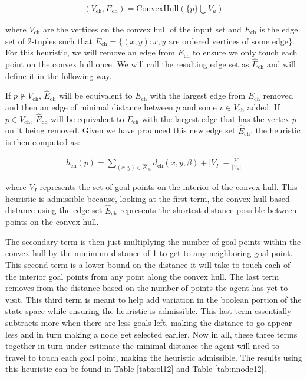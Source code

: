 \documentclass{article}[12pt]
\begin{document}
\begin{align*}
\left(V_{\text{ch}}, E_{\text{ch}} \right) = \text{ConvexHull}\left(\lbrace p \rbrace \bigcup V_u \right)
\end{align*}

where $V_{\text{ch}}$ are the vertices on the convex hull of the input set and $E_{\text{ch}}$ is the edge set of 2-tuples such that $E_{\text{ch}} = \lbrace (x,y): x,y \text{ are ordered vertices of some edge} \rbrace$. For this heuristic, we will remove an edge from $E_{\text{ch}}$ to ensure we only touch each point on the convex hull once. We will call the resulting edge set as $\hat{E}_{\text{ch}}$ and will define it in the following way. 

If $p \notin V_{\text{ch}}$, $\hat{E}_{\text{ch}}$ will be equivalent to $E_{\text{ch}}$ with the largest edge from $E_{\text{ch}}$ removed and then an edge of minimal distance between $p$ and some $v \in V_{\text{ch}}$ added. If $p \in V_{\text{ch}}$, $\hat{E}_{\text{ch}}$ will be equivalent to $E_{\text{ch}}$ with the largest edge that has the vertex $p$ on it being removed. Given we have produced this new edge set $\hat{E}_{\text{ch}}$, the heuristic is then computed as:

\begin{align*}
h_{\text{ch}}(p) = \sum_{(x,y) \in \hat{E}_{\text{ch}}} d_{\text{ch}}(x,y, \beta) + |V_I| - \frac{20}{|V_u|}
\end{align*}

where $V_I$ represents the set of goal points on the interior of the convex hull. This heuristic is admissible because, looking at the first term, the convex hull based distance using the edge set $\hat{E}_{\text{ch}}$ represents the shortest distance possible between points on the convex hull. 

The secondary term is then just multiplying the number of goal points within the convex hull by the minimum distance of 1 to get to any neighboring goal point. This second term is a lower bound on the distance it will take to touch each of the interior goal points from any point along the convex hull. The last term removes from the distance based on the number of points the agent has yet to visit. This third term is meant to help add variation in the boolean portion of the state space while ensuring the heuristic is admissible. This last term essentially subtracts more when there are less goals left, making the distance to go appear less and in turn making a node get selected earlier. Now in all, these three terms together in turn under estimate the minimal distance the agent will need to travel to touch each goal point, making the heuristic admissible. The results using this heuristic can be found in Table \ref{tab:sol12} and Table \ref{tab:nnode12}.
\end{document}
